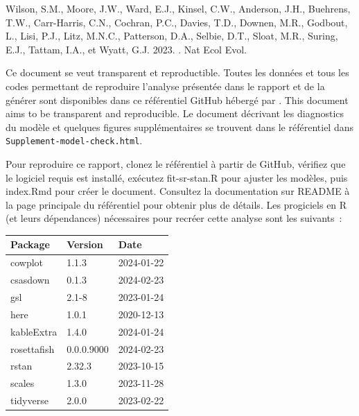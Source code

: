 \documentclass[french,11pt]{book}
\begin{document}
\begin{CSLReferences}{1}{0}
%
Wilson, S.M., Moore, J.W., Ward, E.J., Kinsel, C.W., Anderson, J.H., Buehrens, T.W., Carr-Harris, C.N., Cochran, P.C., Davies, T.D., Downen, M.R., Godbout, L., Lisi, P.J., Litz, M.N.C., Patterson, D.A., Selbie, D.T., Sloat, M.R., Suring, E.J., Tattam, I.A., et Wyatt, G.J. 2023. . Nat Ecol Evol.

\end{CSLReferences}
\setlength{\parindent}{0in} \setlength{\leftskip}{0in} \setlength{\parskip}{4pt}

\Appendices


\clearpage

\label{app:a}

Ce document se veut transparent et reproductible. Toutes les données et tous les codes permettant de reproduire l'analyse présentée dans le rapport et de la générer sont disponibles dans ce référentiel GitHub hébergé par . This document aims to be transparent and reproducible. Le document décrivant les diagnostics du modèle et quelques figures supplémentaires se trouvent dans le référentiel dans \texttt{Supplement-model-check.html}.

Pour reproduire ce rapport, clonez le référentiel à partir de GitHub, vérifiez que le logiciel requis est installé, exécutez fit-sr-stan.R pour ajuster les modèles, puis index.Rmd pour créer le document. Consultez la documentation sur README à la page principale du référentiel pour obtenir plus de détails. Les progiciels en R (et leurs dépendances) nécessaires pour recréer cette analyse sont les suivants~:
\begin{longtable}[]{@{}lll@{}}
\toprule\noalign{}
Package & Version & Date \\
\midrule\noalign{}
\endhead
\bottomrule\noalign{}
\endlastfoot
cowplot & 1.1.3 & 2024-01-22 \\
csasdown & 0.1.3 & 2024-02-23 \\
gsl & 2.1-8 & 2023-01-24 \\
here & 1.0.1 & 2020-12-13 \\
kableExtra & 1.4.0 & 2024-01-24 \\
rosettafish & 0.0.0.9000 & 2024-02-23 \\
rstan & 2.32.3 & 2023-10-15 \\
scales & 1.3.0 & 2023-11-28 \\
tidyverse & 2.0.0 & 2023-02-22 \\
\end{longtable}
\end{document}
